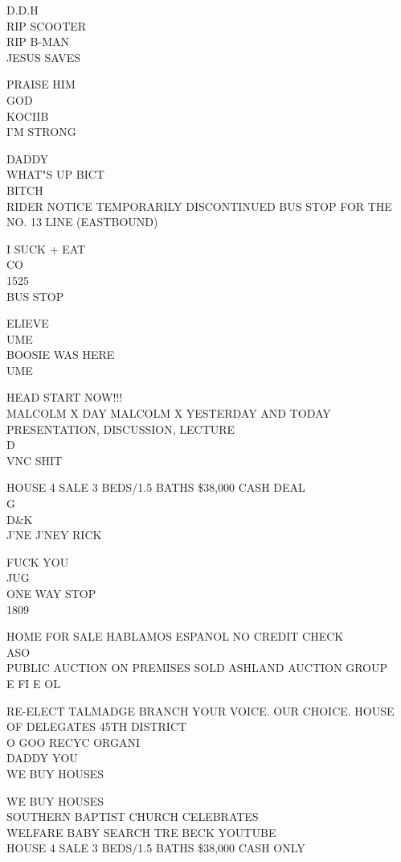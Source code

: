\documentclass[10pt,letterpaper]{article}
\begin{document}
D.D.H\\
RIP SCOOTER\\
RIP B{-}MAN\\
JESUS SAVES

PRAISE HIM\\
GOD\\
KOCIIB\\
I'M STRONG

DADDY\\
WHAT"S UP BICT\\
BITCH\\
RIDER NOTICE TEMPORARILY DISCONTINUED BUS STOP FOR THE NO. 13 LINE (EASTBOUND)

I SUCK + EAT\\
CO\\
1525\\
BUS STOP

ELIEVE\\
UME\\
BOOSIE WAS HERE\\
UME

HEAD START NOW!!!\\
MALCOLM X DAY MALCOLM X YESTERDAY AND TODAY PRESENTATION, DISCUSSION, LECTURE\\
D\\
VNC SHIT

HOUSE 4 SALE 3 BEDS/1.5 BATHS \$38,000 CASH DEAL\\
G\\
D\&K\\
J'NE J'NEY RICK

FUCK YOU\\
JUG\\
ONE WAY STOP\\
1809

HOME FOR SALE HABLAMOS ESPANOL NO CREDIT CHECK\\
ASO\\
PUBLIC AUCTION ON PREMISES SOLD ASHLAND AUCTION GROUP\\
E FI E OL

RE{-}ELECT TALMADGE BRANCH YOUR VOICE.  OUR CHOICE.  HOUSE OF DELEGATES 45TH DISTRICT\\
O GOO RECYC ORGANI\\
DADDY YOU\\
WE BUY HOUSES

WE BUY HOUSES\\
SOUTHERN BAPTIST CHURCH CELEBRATES\\
WELFARE BABY SEARCH TRE BECK YOUTUBE\\
HOUSE 4 SALE 3 BEDS/1.5 BATHS \$38,000 CASH ONLY
\end{document}

